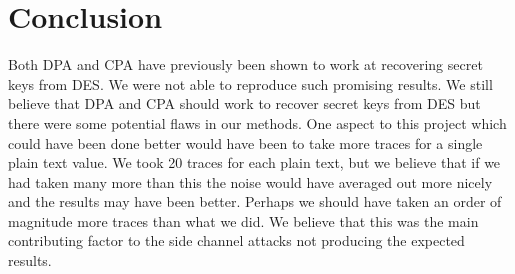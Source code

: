 \section{Conclusion}\label{sec::conclusion} 


	Both DPA and CPA have previously been shown to work at recovering secret keys from DES.  We were not able to reproduce such promising results.  We still believe that DPA and CPA should work to recover secret keys from DES but there were some potential flaws in our methods.
  One aspect to this project which could have been done better would have been to take more traces for a single plain text value.  We took 20 traces for each plain text, but we believe that if we had taken many more than this the noise would have averaged out more nicely and the results may have been better.  Perhaps we should have taken an order of magnitude more traces than what we did.  We believe that this was the main contributing factor to the side channel attacks not producing the expected results.











